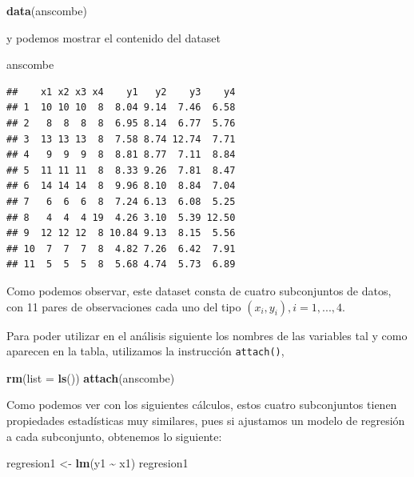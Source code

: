 \documentclass[
]{book}
\newenvironment{Shaded}{\begin{snugshade}}{\end{snugshade}}
\newcommand{\AttributeTok}[1]{\textcolor[rgb]{0.13,0.29,0.53}{#1}}
\newcommand{\FunctionTok}[1]{\textcolor[rgb]{0.13,0.29,0.53}{\textbf{#1}}}
\newcommand{\NormalTok}[1]{#1}
\newcommand{\OtherTok}[1]{\textcolor[rgb]{0.56,0.35,0.01}{#1}}
\newcommand{\SpecialCharTok}[1]{\textcolor[rgb]{0.81,0.36,0.00}{\textbf{#1}}}
\begin{document}
\begin{Shaded}
\begin{Highlighting}[]
\FunctionTok{data}\NormalTok{(anscombe)}
\end{Highlighting}
\end{Shaded}

y podemos mostrar el contenido del dataset

\begin{Shaded}
\begin{Highlighting}[]
\NormalTok{anscombe}
\end{Highlighting}
\end{Shaded}

\begin{verbatim}
##    x1 x2 x3 x4    y1   y2    y3    y4
## 1  10 10 10  8  8.04 9.14  7.46  6.58
## 2   8  8  8  8  6.95 8.14  6.77  5.76
## 3  13 13 13  8  7.58 8.74 12.74  7.71
## 4   9  9  9  8  8.81 8.77  7.11  8.84
## 5  11 11 11  8  8.33 9.26  7.81  8.47
## 6  14 14 14  8  9.96 8.10  8.84  7.04
## 7   6  6  6  8  7.24 6.13  6.08  5.25
## 8   4  4  4 19  4.26 3.10  5.39 12.50
## 9  12 12 12  8 10.84 9.13  8.15  5.56
## 10  7  7  7  8  4.82 7.26  6.42  7.91
## 11  5  5  5  8  5.68 4.74  5.73  6.89
\end{verbatim}

Como podemos observar, este dataset consta de cuatro subconjuntos de datos, con 11 pares de observaciones cada uno del tipo \((x_i,y_i), i = 1, ..., 4\).

Para poder utilizar en el análisis siguiente los nombres de las variables tal y como aparecen en la tabla, utilizamos la instrucción \texttt{attach()},

\begin{Shaded}
\begin{Highlighting}[]
\FunctionTok{rm}\NormalTok{(}\AttributeTok{list =} \FunctionTok{ls}\NormalTok{())}
\FunctionTok{attach}\NormalTok{(anscombe)}
\end{Highlighting}
\end{Shaded}

Como podemos ver con los siguientes cálculos, estos cuatro subconjuntos tienen propiedades estadísticas muy similares, pues si ajustamos un modelo de regresión a cada subconjunto, obtenemos lo siguiente:

\begin{Shaded}
\begin{Highlighting}[]
\NormalTok{regresion1 }\OtherTok{\textless{}{-}} \FunctionTok{lm}\NormalTok{(y1 }\SpecialCharTok{\textasciitilde{}}\NormalTok{ x1)}
\NormalTok{regresion1}
\end{Highlighting}
\end{Shaded}
\end{document}
